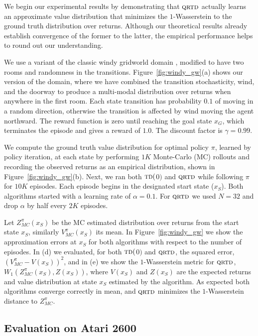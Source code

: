\documentclass[letterpaper]{article}
\def \td {\textsc{td}($0$)}
\def \qrtd {\textsc{qrtd}}
\begin{document}
We begin our experimental results by demonstrating that $\qrtd$ actually learns an approximate value distribution that minimizes the $1$-Wasserstein to the ground truth distribution over returns. Although our theoretical results already establish convergence of the former to the latter, the empirical performance helps to round out our understanding.

We use a variant of the classic windy gridworld domain \cite{sutton98reinforcement}, modified to have two rooms and randomness in the transitions. Figure~\ref{fig:windy_gw}(a) shows our version of the domain, where we have combined the transition stochasticity, wind, and the doorway to produce a multi-modal distribution over returns when anywhere in the first room. Each state transition has probability $0.1$ of moving in a random direction, otherwise the transition is affected by wind moving the agent northward. The reward function is zero until reaching the goal state $x_G$, which terminates the episode and gives a reward of $1.0$. The discount factor is $\gamma = 0.99$.

We compute the ground truth value distribution for optimal policy $\pi$, learned by policy iteration, at each state by performing $1K$ Monte-Carlo (MC) rollouts and recording the observed returns as an empirical distribution, shown in Figure~\ref{fig:windy_gw}(b). Next, we ran both $\td$ and $\qrtd$ while following $\pi$ for $10K$ episodes. Each episode begins in the designated start state ($x_S$). Both algorithms started with a learning rate of $\alpha = 0.1$. For $\qrtd$ we used $N = 32$ and drop $\alpha$ by half every $2K$ episodes.

Let $Z^\pi_{MC}(x_S)$ be the MC estimated distribution over returns from the start state $x_S$, similarly $V^\pi_{MC}(x_S)$ its mean. In Figure~\ref{fig:windy_gw} we show the approximation errors at $x_S$ for both algorithms with respect to the number of episodes. In (d) we evaluated, for both $\td$ and $\qrtd$, the squared error, $(V^\pi_{MC} - V(x_S))^2$, and in (e) we show the $1$-Wasserstein metric for $\qrtd$, $W_1(Z^\pi_{MC}(x_S), Z(x_S))$, where $V(x_S)$ and $Z(x_S)$ are the expected returns and value distribution at state $x_S$ estimated by the algorithm. As expected both algorithms converge correctly in mean, and $\qrtd$ minimizes the $1$-Wasserstein distance to $Z^\pi_{MC}$.


\subsection{Evaluation on Atari 2600}
\end{document}
